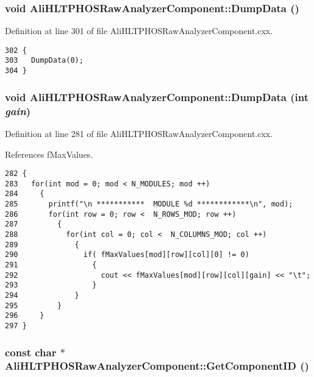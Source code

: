\subsubsection{\setlength{\rightskip}{0pt plus 5cm}void Ali\-HLTPHOSRaw\-Analyzer\-Component::Dump\-Data ()}\label{classAliHLTPHOSRawAnalyzerComponent_AliHLTPHOSRawAnalyzerPeakFinderComponenta8}




Definition at line 301 of file Ali\-HLTPHOSRaw\-Analyzer\-Component.cxx.

\footnotesize\begin{verbatim}302 {
303   DumpData(0);
304 }
\end{verbatim}\normalsize 


\subsubsection{\setlength{\rightskip}{0pt plus 5cm}void Ali\-HLTPHOSRaw\-Analyzer\-Component::Dump\-Data (int {\em gain})}\label{classAliHLTPHOSRawAnalyzerComponent_AliHLTPHOSRawAnalyzerPeakFinderComponenta7}




Definition at line 281 of file Ali\-HLTPHOSRaw\-Analyzer\-Component.cxx.

References f\-Max\-Values.

\footnotesize\begin{verbatim}282 {
283   for(int mod = 0; mod < N_MODULES; mod ++)
284     {
285       printf("\n ***********  MODULE %d ************\n", mod);
286       for(int row = 0; row <  N_ROWS_MOD; row ++)
287         {
288           for(int col = 0; col <  N_COLUMNS_MOD; col ++)
289             {
290               if( fMaxValues[mod][row][col][0] != 0)
291                 { 
292                   cout << fMaxValues[mod][row][col][gain] << "\t";
293                 }
294             }
295         } 
296     }
297 }
\end{verbatim}\normalsize 


\subsubsection{\setlength{\rightskip}{0pt plus 5cm}const char $\ast$ Ali\-HLTPHOSRaw\-Analyzer\-Component::Get\-Component\-ID ()\hspace{0.3cm}{\tt  [pure virtual]}}\label{classAliHLTPHOSRawAnalyzerComponent_AliHLTPHOSRawAnalyzerComponenta13}




